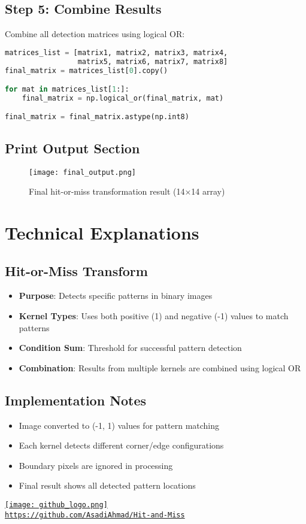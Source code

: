 \documentclass[12pt]{article}
\begin{document}
\subsection{Step 5: Combine Results}
Combine all detection matrices using logical OR:

\begin{lstlisting}[language=Python]
matrices_list = [matrix1, matrix2, matrix3, matrix4, 
                 matrix5, matrix6, matrix7, matrix8]
final_matrix = matrices_list[0].copy()

for mat in matrices_list[1:]:
    final_matrix = np.logical_or(final_matrix, mat)

final_matrix = final_matrix.astype(np.int8)
\end{lstlisting}

\subsection{Print Output Section}
\begin{figure}[H] %
    \centering
    \texttt{[image: final\_output.png]}
    \caption{Final hit-or-miss transformation result (14×14 array)}
    \label{fig:final}
\end{figure}

\section{Technical Explanations}

\subsection{Hit-or-Miss Transform}
\begin{itemize}
    \item \textbf{Purpose}: Detects specific patterns in binary images
    \item \textbf{Kernel Types}: Uses both positive (1) and negative (-1) values to match patterns
    \item \textbf{Condition Sum}: Threshold for successful pattern detection
    \item \textbf{Combination}: Results from multiple kernels are combined using logical OR
\end{itemize}

\subsection{Implementation Notes}
\begin{itemize}
    \item Image converted to (-1, 1) values for pattern matching
    \item Each kernel detects different corner/edge configurations
    \item Boundary pixels are ignored in processing
    \item Final result shows all detected pattern locations
\end{itemize}

\begin{center}
    \href{https://github.com/AsadiAhmad/Hit-and-Miss}{
        \texttt{[image: github\_logo.png]} \\
        \texttt{https://github.com/AsadiAhmad/Hit-and-Miss}
    }
\end{center}
\end{document}
